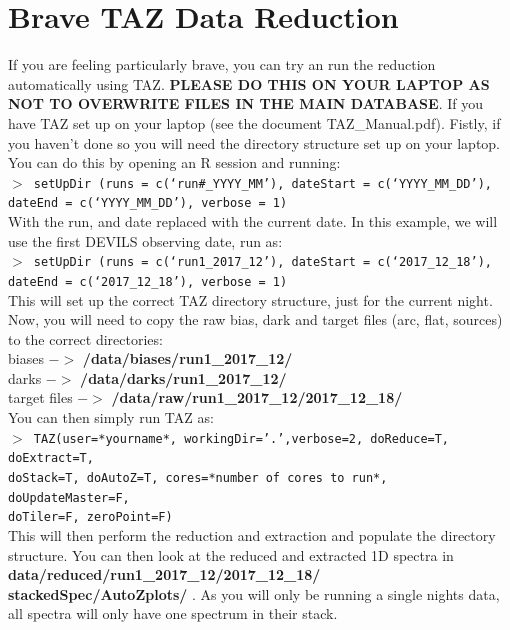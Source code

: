 \documentclass[12pt]{article}
\begin{document}
\section{Brave TAZ Data Reduction}

If you are feeling particularly brave, you can try an run the reduction automatically using TAZ. \textbf{\textcolor{PineGreen}{PLEASE DO THIS ON YOUR LAPTOP AS NOT TO OVERWRITE FILES IN THE MAIN DATABASE}}. If you have TAZ set up on your laptop (see the document TAZ\_Manual.pdf). Fistly, if you haven't done so you will need the directory structure set up on your laptop. You can do this by opening an R session and running:\\

\texttt{$>$ setUpDir (runs = c(`run\#\_YYYY\_MM'), dateStart = c(`YYYY\_MM\_DD'), dateEnd = c(`YYYY\_MM\_DD'), verbose = 1)} \\

With the run, and date replaced with the current date. In this example, we will use the first DEVILS observing date, run as:\\

\texttt{$>$ setUpDir (runs = c(`run1\_2017\_12'), dateStart = c(`2017\_12\_18'), dateEnd = c(`2017\_12\_18'), verbose = 1)} \\

 This will set up the correct TAZ directory structure, just for the current night. Now, you will need to copy the raw bias, dark and target files (arc, flat, sources) to the correct directories:\\

biases $->$ \textbf{/data/biases/run1\_2017\_12/}\\
darks $->$ \textbf{/data/darks/run1\_2017\_12/}\\
target files $->$ \textbf{/data/raw/run1\_2017\_12/2017\_12\_18/}\\

You can then simply run TAZ as:\\

\texttt{$>$ TAZ(user=*yourname*, workingDir='.',verbose=2, doReduce=T, doExtract=T,  \\ doStack=T, doAutoZ=T, cores=*number of cores to run*, doUpdateMaster=F, \\ doTiler=F, zeroPoint=F)} \\

This will then perform the reduction and extraction and populate the directory structure. You can then look at the reduced and extracted 1D spectra in \textbf{data/reduced/run1\_2017\_12/2017\_12\_18/ \\ stackedSpec/AutoZplots/ }. As you will only be running a single nights data, all spectra will only have one spectrum in their stack. 
\end{document}
